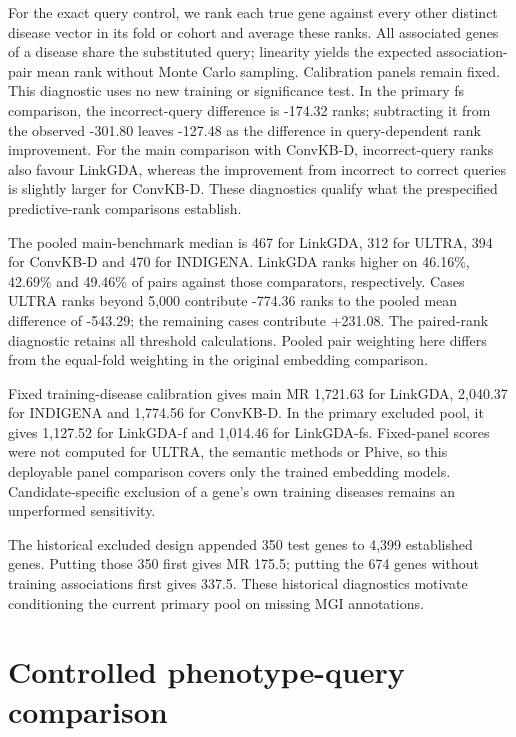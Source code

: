\documentclass{article}
\begin{document}




For the exact query control, we rank each true gene against every other distinct
disease vector in its fold or cohort and average these ranks. All associated
genes of a disease share the substituted query; linearity yields the expected
association-pair mean rank without Monte Carlo sampling. Calibration panels
remain fixed. This diagnostic uses no new training or significance test.
In the primary fs comparison, the incorrect-query difference is -174.32 ranks;
subtracting it from the observed -301.80 leaves -127.48 as the difference in
query-dependent rank improvement. For the main comparison with ConvKB-D,
incorrect-query ranks also favour LinkGDA, whereas the improvement from
incorrect to correct queries is slightly larger for ConvKB-D. These diagnostics
qualify what the prespecified predictive-rank comparisons establish.

The pooled main-benchmark median is 467 for LinkGDA, 312 for ULTRA, 394 for
ConvKB-D and 470 for INDIGENA. LinkGDA ranks higher on 46.16\%, 42.69\% and
49.46\% of pairs against those comparators, respectively. Cases ULTRA ranks
beyond 5,000 contribute -774.36 ranks to the pooled mean difference of -543.29;
the remaining cases contribute +231.08. The paired-rank diagnostic retains
all threshold calculations. Pooled pair weighting here differs from the
equal-fold weighting in the original embedding comparison.

Fixed training-disease calibration gives main MR 1,721.63 for LinkGDA,
2,040.37 for INDIGENA and 1,774.56 for ConvKB-D. In the primary excluded pool,
it gives 1,127.52 for LinkGDA-f and 1,014.46 for LinkGDA-fs. Fixed-panel scores
were not computed for ULTRA, the semantic methods or Phive, so this deployable
panel comparison covers only the trained embedding models. Candidate-specific
exclusion of a gene's own training diseases remains an unperformed sensitivity.

The historical excluded design appended 350 test genes to 4,399 established
genes. Putting those 350 first gives MR 175.5; putting the 674 genes without
training associations first gives 337.5. These historical diagnostics motivate
conditioning the current primary pool on missing MGI annotations.

\section{Controlled phenotype-query comparison}
\label{sec:controlled_query}
\end{document}
